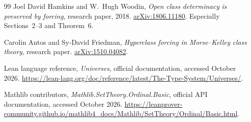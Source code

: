 \documentclass[11pt]{article}
\theoremstyle{definition}
\theoremstyle{remark}
\begin{document}
\begin{thebibliography}{99}
Joel David Hamkins and W.~Hugh Woodin,
\emph{Open class determinacy is preserved by forcing},
research paper, 2018.
\href{https://arxiv.org/abs/1806.11180}{arXiv:1806.11180}.
Especially Sections~2--3 and Theorem~6.

Carolin Antos and Sy-David Friedman,
\emph{Hyperclass forcing in Morse--Kelley class theory},
research paper.
\href{https://arxiv.org/abs/1510.04082}{arXiv:1510.04082}.

Lean language reference,
\emph{Universes}, official documentation, accessed October 2026.
\url{https://lean-lang.org/doc/reference/latest/The-Type-System/Universes/}.

Mathlib contributors,
\emph{Mathlib.SetTheory.Ordinal.Basic}, official API documentation,
accessed October 2026.
\url{https://leanprover-community.github.io/mathlib4_docs/Mathlib/SetTheory/Ordinal/Basic.html}.

\end{thebibliography}
\end{document}
